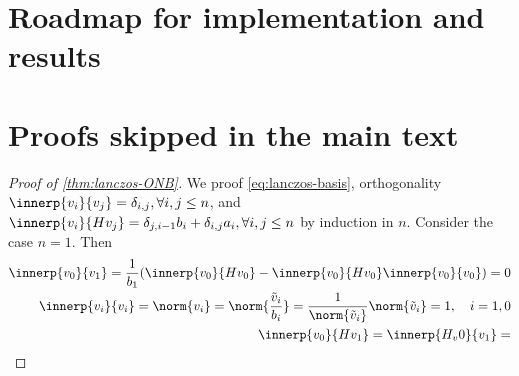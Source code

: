\appendix

\section{Roadmap for implementation and results}

\section{Proofs skipped in the main text}
\begin{proof}[Proof of \cref{thm:lanczos-ONB}]
    We proof \cref{eq:lanczos-basis}, orthogonality \(\innerp{v_i}{v_j} = \delta_{i,j}, \forall i,j \leq n\), and \(\innerp{v_i}{H v_j} = \delta_{j, i-1} b_i + \delta_{i,j} a_i, \forall i,j \leq n\) by induction in \(n\).
    Consider the case \(n=1\).
    Then 
    \begin{align}
        \innerp{v_0}{v_1} = \frac{1}{b_1} \of*{ \innerp{v_0}{H v_0} - \innerp{v_0}{H v_0} \innerp{v_0}{v_0} } = 0
        \\
        \innerp{v_i}{v_i} = \norm{v_i} = \norm{\frac{\tilde v_i}{b_i}} = \frac{1}{\norm{\tilde v_i}}\norm{\tilde v_i} = 1, \quad i = 1,0
        \\
        \innerp{v_0}{H v_1} = \innerp{H_v 0}{v_1} = 
    \end{align}
\end{proof}


